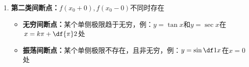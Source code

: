 \begin{enumerate}[(1)]
  \item {\bf 第二类间断点：}$f(x_0+0),f(x_0-0)$不同时存在
  \begin{itemize}
    \item {\bf 无穷间断点：}某个单侧极限趋于无穷，例：$y=\tan x$和$y=\sec x$在$x=k\pi+\df{\pi}2$处
     \begin{center}
 	\end{center}
    \item {\bf 振荡间断点：}某个单侧极限不存在，且非无穷，例：$y=\sin\df1x$在$x=0$处
    \begin{center}
 	\end{center}
  \end{itemize}
\end{enumerate}

